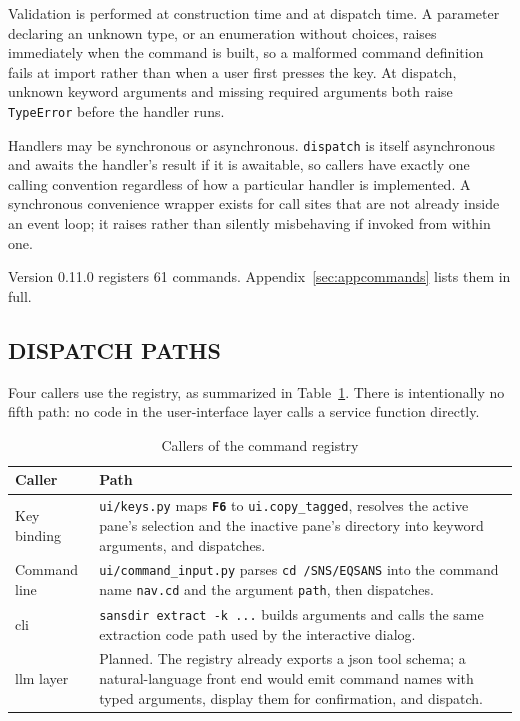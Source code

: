\documentclass[tm]{ornltm}
\newcommand{\cmd}[1]{\texttt{#1}}
\newcommand{\key}[1]{\textbf{\texttt{#1}}}
\begin{document}
Validation is performed at construction time and at dispatch time. A parameter
declaring an unknown type, or an enumeration without choices, raises
immediately when the command is built, so a malformed command definition fails
at import rather than when a user first presses the key. At dispatch, unknown
keyword arguments and missing required arguments both raise \texttt{TypeError}
before the handler runs.

Handlers may be synchronous or asynchronous. \texttt{dispatch} is itself
asynchronous and awaits the handler's result if it is awaitable, so callers have
exactly one calling convention regardless of how a particular handler is
implemented. A synchronous convenience wrapper exists for call sites that are not
already inside an event loop; it raises rather than silently misbehaving if
invoked from within one.

Version 0.11.0 registers 61 commands. Appendix~\ref{sec:appcommands} lists them
in full.

\subsection{DISPATCH PATHS}

Four callers use the registry, as summarized in Table~\ref{tab:dispatch}. There
is intentionally no fifth path: no code in the user-interface layer calls a
service function directly.

\begin{table}[ht]
  \centering
  \caption{Callers of the command registry}
  \label{tab:dispatch}
  \small
  \begin{tabular}{p{} p{}}
    \toprule
    Caller & Path \\
    \midrule
    Key binding &
      \texttt{ui/keys.py} maps \key{F6} to \cmd{ui.copy\_tagged}, resolves the
      active pane's selection and the inactive pane's directory into keyword
      arguments, and dispatches. \\
    Command line &
      \texttt{ui/command\_input.py} parses \texttt{cd /SNS/EQSANS} into the
      command name \cmd{nav.cd} and the argument \texttt{path}, then
      dispatches. \\
    \Ac{cli} &
      \texttt{sansdir extract -k ...} builds arguments and calls the same
      extraction code path used by the interactive dialog. \\
    \Ac{llm} layer &
      Planned. The registry already exports a \ac{json} tool schema; a
      natural-language front end would emit command names with typed arguments,
      display them for confirmation, and dispatch. \\
    \bottomrule
  \end{tabular}
\end{table}
\end{document}
